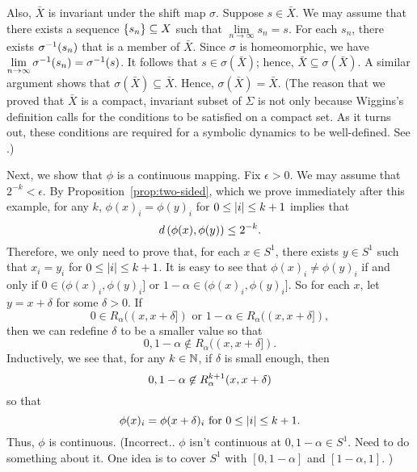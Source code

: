 \documentclass[10pt,twoside,draft]{book}
\begin{document}
\begin{example}
  Also, $\bar{X}$ is invariant under the shift map $\sigma$.
  Suppose $s \in \bar{X}$.
  We may assume that there exists a sequence $\left \{ s_n \right \} \subseteq X$ such that $\lim\limits_{n \to \infty} s_n = s$.
  For each $s_n$, there exists $\sigma^{-1}(s_n)$ that is a member of $\bar{X}$.
  Since $\sigma$ is homeomorphic, we have $\lim\limits_{n \to \infty} \sigma^{-1}(s_n) = \sigma^{-1}(s)$.
  It follows that $s \in \sigma(\bar{X})$; hence, $\bar{X} \subseteq \sigma(\bar{X})$.
  A similar argument shows that $\sigma(\bar{X}) \subseteq \bar{X}$.
  Hence, $\sigma(\bar{X}) = \bar{X}$.
  (The reason that we proved that $\bar{X}$ is a compact, invariant subset of $\Sigma$ is not only because Wiggins's definition calls for the conditions to be satisfied on a compact set.
  As it turns out, these conditions are required for a symbolic dynamics to be well-defined.
  See \citep[p.179]{lind}.)
  
  Next, we show that $\phi$ is a continuous mapping.
  Fix $\epsilon > 0$.
  We may assume that $2^{-k} < \epsilon$.
  By Proposition~\ref{prop:two-sided}, which we prove immediately after this example, for any $k$, $\phi(x)_i = \phi(y)_i$ for $0 \leq \left | i \right | \leq k+1$ implies that
  \begin{equation*}
    d\left( \phi(x),\phi(y) \right) \leq 2^{-k}.
  \end{equation*}
  Therefore, we only need to prove that, for each $x \in S^1$, there exists $y \in S^1$ such that $x_i = y_i$ for $0 \leq \left | i \right | \leq k+1$.
  It is easy to see that $\phi(x)_i \neq \phi(y)_i$ if and only if $0 \in (\phi(x)_i, \phi(y)_i]$ or $1 - \alpha \in (\phi(x)_i, \phi(y)_i]$. %
  So for each $x$, let $y = x + \delta$ for some $\delta > 0$.
  If 
  \begin{equation*}
    0 \in R_\alpha((x, x+\delta]) \mbox{ or } 1 - \alpha \in R_\alpha((x, x+\delta]), 
  \end{equation*}
   then we can redefine $\delta$ to be a smaller value so that 
   \begin{equation*}
     0, 1-\alpha \not\in R_\alpha((x, x+\delta]). %
   \end{equation*}
  Inductively, we see that, for any $k \in \mathbb{N}$, if $\delta$ is small enough, then 
  \begin{equation*}
    0, 1-\alpha \not\in R_\alpha^{k+1}(x, x+\delta) 
  \end{equation*}
  so that
  \begin{equation*}
    \phi(x)_i = \phi(x+\delta)_i \mbox{ for } 0 \leq \left | i \right | \leq k+1.
  \end{equation*}
  Thus, $\phi$ is continuous.
  (Incorrect.. $\phi$ isn't continuous at $0, 1-\alpha \in S^1$. Need to do something about it.
  One idea is to cover $S^1$ with $[0,1-\alpha]$ and $[1-\alpha, 1]$.
  )


\end{example}
\end{document}
